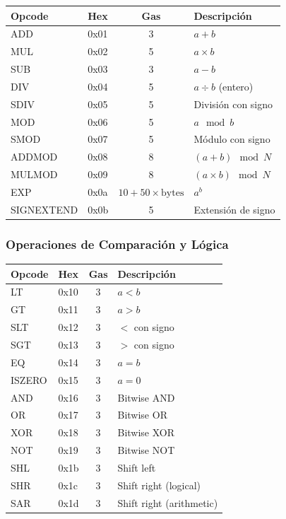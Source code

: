 \documentclass[11pt,a4paper,twoside,openright]{book}
\theoremstyle{definition}
\theoremstyle{plain}
\theoremstyle{remark}
\begin{document}
\begin{center}
\begin{tabular}{llcl}
\toprule
\textbf{Opcode} & \textbf{Hex} & \textbf{Gas} & \textbf{Descripción} \\
\midrule
ADD & 0x01 & 3 & $a + b$ \\
MUL & 0x02 & 5 & $a \times b$ \\
SUB & 0x03 & 3 & $a - b$ \\
DIV & 0x04 & 5 & $a \div b$ (entero) \\
SDIV & 0x05 & 5 & División con signo \\
MOD & 0x06 & 5 & $a \mod b$ \\
SMOD & 0x07 & 5 & Módulo con signo \\
ADDMOD & 0x08 & 8 & $(a + b) \mod N$ \\
MULMOD & 0x09 & 8 & $(a \times b) \mod N$ \\
EXP & 0x0a & $10 + 50 \times \text{bytes}$ & $a^b$ \\
SIGNEXTEND & 0x0b & 5 & Extensión de signo \\
\bottomrule
\end{tabular}
\end{center}

\subsubsection{Operaciones de Comparación y Lógica}

\begin{center}
\begin{tabular}{llcl}
\toprule
\textbf{Opcode} & \textbf{Hex} & \textbf{Gas} & \textbf{Descripción} \\
\midrule
LT & 0x10 & 3 & $a < b$ \\
GT & 0x11 & 3 & $a > b$ \\
SLT & 0x12 & 3 & $<$ con signo \\
SGT & 0x13 & 3 & $>$ con signo \\
EQ & 0x14 & 3 & $a = b$ \\
ISZERO & 0x15 & 3 & $a = 0$ \\
AND & 0x16 & 3 & Bitwise AND \\
OR & 0x17 & 3 & Bitwise OR \\
XOR & 0x18 & 3 & Bitwise XOR \\
NOT & 0x19 & 3 & Bitwise NOT \\
SHL & 0x1b & 3 & Shift left \\
SHR & 0x1c & 3 & Shift right (logical) \\
SAR & 0x1d & 3 & Shift right (arithmetic) \\
\bottomrule
\end{tabular}
\end{center}
\end{document}
